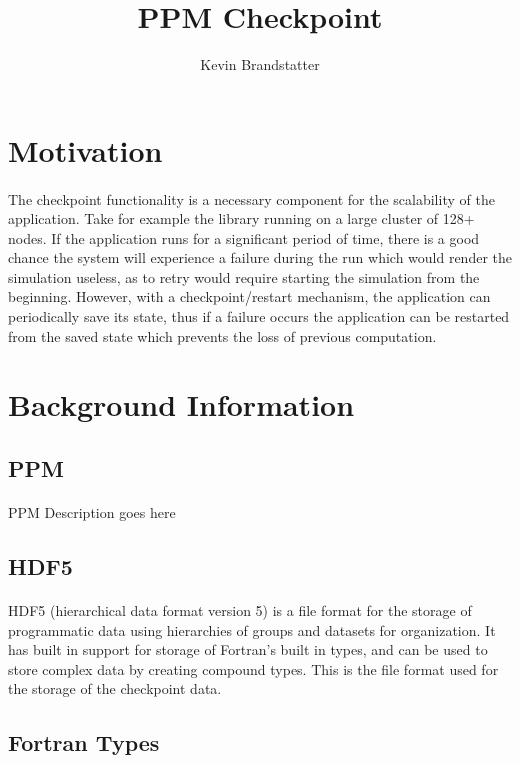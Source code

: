 \documentclass{article}
\title{PPM Checkpoint}
\author{Kevin Brandstatter}
\begin{document}
\maketitle
\section{Motivation}
\paragraph{}
The checkpoint functionality is a necessary component for the scalability of the application. Take for example the library running on a large cluster of 128+ nodes. If the application runs for a significant period of time, there is a good chance the system will experience a failure during the run which would render the simulation useless, as to retry would require starting the simulation from the beginning. However, with a checkpoint/restart mechanism, the application can periodically save its state, thus if a failure occurs the application can be restarted from the saved state which prevents the loss of previous computation.

\section{Background Information}
\subsection{PPM}
\paragraph{}
PPM Description goes here
\subsection{HDF5}
\paragraph{}
HDF5 (hierarchical data format version 5) is a file format for the storage of programmatic data using hierarchies of groups and datasets for organization. It has built in support for storage of Fortran's built in types, and can be used to store complex data by creating compound types. This is the file format used for the storage of the checkpoint data.

\subsection{Fortran Types}
\end{document}
